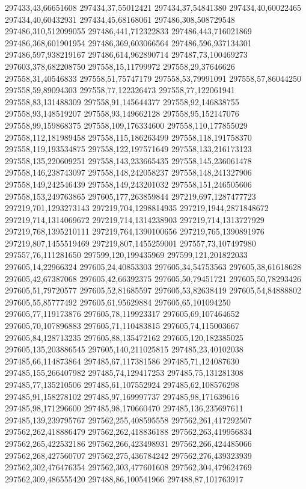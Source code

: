 297433,43,66651608
297434,37,55012421
297434,37,54841380
297434,40,60022465
297434,40,60432931
297434,45,68168061
297486,308,508729548
297486,310,512099055
297486,441,712322833
297486,443,716021869
297486,368,601901954
297486,369,603066564
297486,596,937134301
297486,597,938219167
297486,614,962890714
297487,73,100469273
297603,378,682208750
297558,15,11799972
297558,29,37646626
297558,31,40546833
297558,51,75747179
297558,53,79991091
297558,57,86044250
297558,59,89094303
297558,77,122326473
297558,77,122061941
297558,83,131488309
297558,91,145644377
297558,92,146838755
297558,93,148519207
297558,93,149662128
297558,95,152147076
297558,99,159868375
297558,109,176334600
297558,110,177855029
297558,112,181989458
297558,115,186263499
297558,118,191758370
297558,119,193534875
297558,122,197571649
297558,133,216173123
297558,135,220609251
297558,143,233665435
297558,145,236061478
297558,146,238743097
297558,148,242058237
297558,148,241327906
297558,149,242546439
297558,149,243201032
297558,151,246505606
297558,153,249763865
297605,177,263859844
297219,697,1287477723
297219,701,1293273143
297219,704,1298814935
297219,1944,2871848672
297219,714,1314069672
297219,714,1314238903
297219,714,1313727929
297219,768,1395210111
297219,764,1390100656
297219,765,1390891976
297219,807,1455519469
297219,807,1455259001
297557,73,107497980
297557,76,111281650
297599,120,199435969
297599,121,201822033
297605,14,22966324
297605,24,40853303
297605,34,54753563
297605,38,61618628
297605,42,67387068
297605,42,66392375
297605,50,79451721
297605,50,78293426
297605,51,79720577
297605,52,81685597
297605,53,82638419
297605,54,84888802
297605,55,85777492
297605,61,95629884
297605,65,101094250
297605,77,119173876
297605,78,119923317
297605,69,107464652
297605,70,107896883
297605,71,110483815
297605,74,115003667
297605,84,128713235
297605,88,135472162
297605,120,182385025
297605,135,203886545
297605,140,211025815
297485,23,40102038
297485,66,114873864
297485,67,117381586
297485,71,124087630
297485,155,266407982
297485,74,129417253
297485,75,131281308
297485,77,135210506
297485,61,107552924
297485,62,108576298
297485,91,158278102
297485,97,169997737
297485,98,171639616
297485,98,171296600
297485,98,170660470
297485,136,235697611
297485,139,239795767
297562,255,408595558
297562,261,417292507
297562,262,418886479
297562,262,418836188
297562,263,419956834
297562,265,422532186
297562,266,423498931
297562,266,424485066
297562,268,427560707
297562,275,436784242
297562,276,439323939
297562,302,476476354
297562,303,477601608
297562,304,479624769
297562,309,486555420
297488,86,100541966
297488,87,101763917
